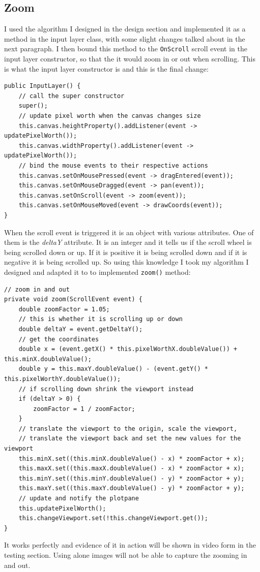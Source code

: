 \documentclass[../../../../main.tex]{subfiles}
\begin{document}
\subsection{Zoom}
I used the algorithm I designed in the design section and implemented it as a method in the input layer class, with some slight changes talked about in the next paragraph. I then bound this method to the \texttt{OnScroll} scroll event in the input layer constructor, so that the it would zoom in or out when scrolling. This is what the input layer constructor is and this is the final change:
\begin{verbatim}
public InputLayer() {
	// call the super constructor
	super();
	// update pixel worth when the canvas changes size
	this.canvas.heightProperty().addListener(event -> updatePixelWorth());
	this.canvas.widthProperty().addListener(event -> updatePixelWorth());
	// bind the mouse events to their respective actions
	this.canvas.setOnMousePressed(event -> dragEntered(event));
	this.canvas.setOnMouseDragged(event -> pan(event));
	this.canvas.setOnScroll(event -> zoom(event));
	this.canvas.setOnMouseMoved(event -> drawCoords(event));
}
\end{verbatim}
When the scroll event is triggered it is an object with various attributes. One of them is the \textit{deltaY} attribute. It is an integer and it tells us if the scroll wheel is being scrolled down or up. If it is positive it is being scrolled down and if it is negative it is being scrolled up. So using this knowledge I took my algorithm I designed and adapted it to to implemented \texttt{zoom()} method:
\begin{verbatim}
// zoom in and out
private void zoom(ScrollEvent event) {
	double zoomFactor = 1.05;
	// this is whether it is scrolling up or down
	double deltaY = event.getDeltaY();
	// get the coordinates
	double x = (event.getX() * this.pixelWorthX.doubleValue()) + this.minX.doubleValue();
	double y = this.maxY.doubleValue() - (event.getY() * this.pixelWorthY.doubleValue());
	// if scrolling down shrink the viewport instead
	if (deltaY > 0) {
		zoomFactor = 1 / zoomFactor;
	}
	// translate the viewport to the origin, scale the viewport,
	// translate the viewport back and set the new values for the viewport
	this.minX.set((this.minX.doubleValue() - x) * zoomFactor + x);
	this.maxX.set((this.maxX.doubleValue() - x) * zoomFactor + x);
	this.minY.set((this.minY.doubleValue() - y) * zoomFactor + y);
	this.maxY.set((this.maxY.doubleValue() - y) * zoomFactor + y);
	// update and notify the plotpane
	this.updatePixelWorth();
	this.changeViewport.set(!this.changeViewport.get());
}
\end{verbatim}
It works perfectly and evidence of it in action will be shown in video form in the testing section. Using alone images will not be able to capture the zooming in and out.
\newpage
\end{document}
